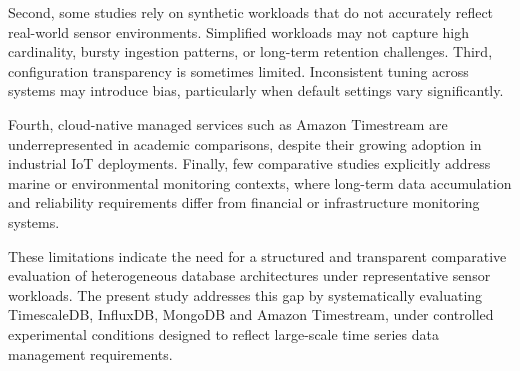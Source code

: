 Second, some studies rely on synthetic workloads that do not accurately reflect real-world sensor environments. Simplified workloads may not capture high cardinality, bursty ingestion patterns, or long-term retention challenges. Third, configuration transparency is sometimes limited. Inconsistent tuning across systems may introduce bias, particularly when default settings vary significantly.

Fourth, cloud-native managed services such as Amazon Timestream are underrepresented in academic comparisons, despite their growing adoption in industrial IoT deployments. Finally, few comparative studies explicitly address marine or environmental monitoring contexts, where long-term data accumulation and reliability requirements differ from financial or infrastructure monitoring systems.

These limitations indicate the need for a structured and transparent comparative evaluation of heterogeneous database architectures under representative sensor workloads. The present study addresses this gap by systematically evaluating TimescaleDB, InfluxDB, MongoDB and Amazon Timestream, under controlled experimental conditions designed to reflect large-scale time series data management requirements.

